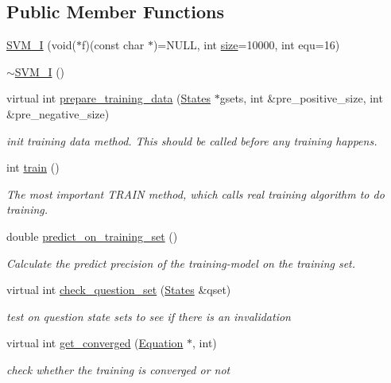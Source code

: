 \subsection*{Public Member Functions}
\begin{DoxyCompactItemize}
\item 
\hyperlink{classSVM__I_aa7843beb94a2df684a5c8874322341c2}{S\+V\+M\+\_\+I} (void($\ast$f)(const char $\ast$)=N\+U\+LL, int \hyperlink{classSVM__I_a1b66cefe313cffaa77d4271dfb4b8474}{size}=10000, int equ=16)
\item 
\hyperlink{classSVM__I_a72cef53f36557c007f36a03724a62fb8}{$\sim$\+S\+V\+M\+\_\+I} ()
\item 
virtual int \hyperlink{classSVM__I_ab0236699daa4967cfec71234faa785c5}{prepare\+\_\+training\+\_\+data} (\hyperlink{classStates}{States} $\ast$gsets, int \&pre\+\_\+positive\+\_\+size, int \&pre\+\_\+negative\+\_\+size)
\begin{DoxyCompactList}\small\item\em init training data method. This should be called before any training happens. \end{DoxyCompactList}\item 
int \hyperlink{classSVM__I_abf732821c264b2cb8bef5d252991f2b6}{train} ()
\begin{DoxyCompactList}\small\item\em The most important T\+R\+A\+IN method, which calls real training algorithm to do training. \end{DoxyCompactList}\item 
double \hyperlink{classSVM__I_a643c2a6e58f8e70ab276ade9b1873bf6}{predict\+\_\+on\+\_\+training\+\_\+set} ()
\begin{DoxyCompactList}\small\item\em Calculate the predict precision of the training-\/model on the training set. \end{DoxyCompactList}\item 
virtual int \hyperlink{classSVM__I_a84470dce77add6377454c4408c6c1466}{check\+\_\+question\+\_\+set} (\hyperlink{classStates}{States} \&qset)
\begin{DoxyCompactList}\small\item\em test on question state sets to see if there is an invalidation \end{DoxyCompactList}\item 
virtual int \hyperlink{classSVM__I_a5d1a8c93d41597aea5f31689687dbc77}{get\+\_\+converged} (\hyperlink{classEquation}{Equation} $\ast$, int)
\begin{DoxyCompactList}\small\item\em check whether the training is converged or not \end{DoxyCompactList}\item 

\end{DoxyCompactItemize}
